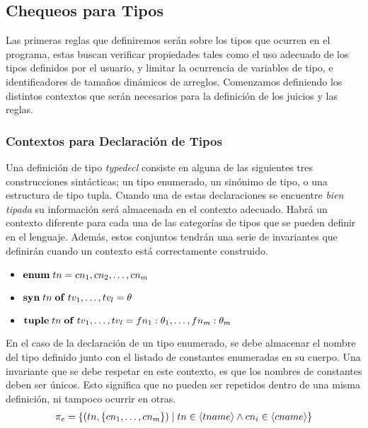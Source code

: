 \subsection{Chequeos para Tipos}

Las primeras reglas que definiremos serán sobre los tipos que ocurren en el programa, estas buscan verificar propiedades tales como el uso adecuado de los tipos definidos por el usuario, y limitar la ocurrencia de variables de tipo, e identificadores de tamaños dinámicos de arreglos. %
Comenzamos definiendo los distintos contextos que serán necesarios para la definición de los juicios y las reglas.

\subsubsection{Contextos para Declaración de Tipos}

Una definición de tipo \textit{typedecl} consiste en alguna de las siguientes tres construcciones sintácticas; un tipo enumerado, un sinónimo de tipo, o una estructura de tipo tupla.
Cuando una de estas declaraciones se encuentre \textit{bien tipada} su información será almacenada en el contexto adecuado.
Habrá un contexto diferente para cada una de las categorías de tipos que se pueden definir en el lenguaje.
Además, estos conjuntos tendrán una serie de invariantes que definirán cuando un contexto está correctamente construido. %

\begin{itemize}
    \item $\mathbf{enum} \; tn = cn_1, cn_2, \ldots, cn_m$
    \item $\mathbf{syn} \; tn \; \mathbf{of} \; tv_1, \ldots, tv_l = \theta$
    \item $\mathbf{tuple} \; tn \; \mathbf{of} \; tv_1, \ldots, tv_l = fn_1 : \theta_1, \ldots, fn_m : \theta_m$
\end{itemize}

En el caso de la declaración de un tipo enumerado, se debe almacenar el nombre del tipo definido junto con el listado de constantes enumeradas en su cuerpo.
Una invariante que se debe respetar en este contexto, es que los nombres de constantes deben ser únicos.
Esto significa que no pueden ser repetidos dentro de una misma definición, ni tampoco ocurrir en otras.
\begin{gather*}
\pi_{e} =
\{ 
(tn, \{ cn_1, \ldots, cn_m \} ) \mid 
tn \in \langle tname \rangle 
\wedge 
cn_i \in \langle cname \rangle
\}
\end{gather*}

